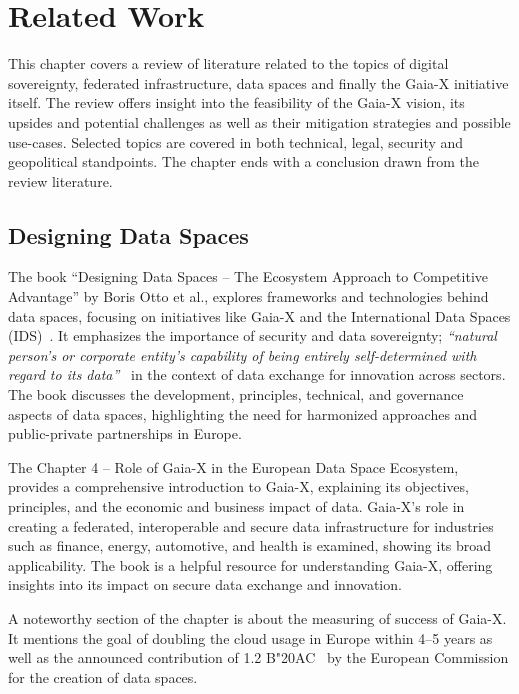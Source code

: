 \chapter{Related Work}\label{ch:related-work}

\begin{chapterabstract}
    This chapter covers a review of literature related to the topics of digital sovereignty, federated infrastructure, data spaces and finally the Gaia-X initiative itself.
    The review offers insight into the feasibility of the Gaia-X vision, its upsides and potential challenges as well as their mitigation strategies and possible use-cases.
    Selected topics are covered in both technical, legal, security and geopolitical standpoints.
    The chapter ends with a conclusion drawn from the review literature.
\end{chapterabstract}

\section{Designing Data Spaces}\label{sec:designing-data-spaces}

The book ``Designing Data Spaces -- The Ecosystem Approach to Competitive Advantage'' by Boris Otto et al., explores frameworks and technologies behind data spaces, focusing on initiatives like Gaia-X and the International Data Spaces (IDS)~\cite{designing_dataspaces}.
It emphasizes the importance of security and data sovereignty; \textit{``natural person’s or corporate entity’s capability of being entirely self-determined with regard to its data''}~\cite{designing_dataspaces} in the context of data exchange for innovation across sectors.
The book discusses the development, principles, technical, and governance aspects of data spaces, highlighting the need for harmonized approaches and public-private partnerships in Europe.

The Chapter 4 -- Role of Gaia-X in the European Data Space Ecosystem, provides a comprehensive introduction to Gaia-X, explaining its objectives, principles, and the economic and business impact of data.
Gaia-X's role in creating a federated, interoperable and secure data infrastructure for industries such as finance, energy, automotive, and health is examined, showing its broad applicability.
The book is a helpful resource for understanding Gaia-X, offering insights into its impact on secure data exchange and innovation.

A noteworthy section of the chapter is about the measuring of success of Gaia-X.
It mentions the goal of doubling the cloud usage in Europe within 4--5 years as well as the announced contribution of 1.2 B\char"20AC~ by the European Commission for the creation of data spaces. %

